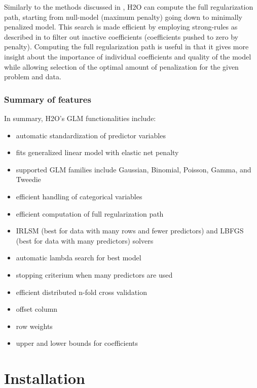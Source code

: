 \documentclass[11pt]{article}
\begin{document}
Similarly to the methods discussed in , H2O can compute the full regularization path, starting from null-model (maximum penalty) going down to minimally penalized model. This search is made efficient by employing strong-rules as described in  to filter out inactive coefficients (coefficients pushed to zero by penalty). Computing the full regularization path is useful in that it gives more insight about the importance of individual coefficients and quality of the model while allowing selection of the optimal amount of penalization for the given problem and data.

\subsubsection{Summary of features} 
In summary, H2O's GLM functionalities include:

\begin{itemize} 
\item automatic standardization of predictor variables
\item fits generalized linear model with elastic net penalty
\item supported GLM families include Gaussian, Binomial, Poisson, Gamma, and Tweedie
\item efficient handling of categorical variables
\item efficient computation of full regularization path
\item IRLSM (best for data with many rows and fewer predictors) and LBFGS (best for data with many predictors) solvers
\item automatic lambda search for best model
\item stopping criterium when many predictors are used
\item efficient distributed n-fold cross validation
\item offset column
\item row weights
\item upper and lower bounds for coefficients
\end{itemize}


\section{Installation} 
\end{document}
